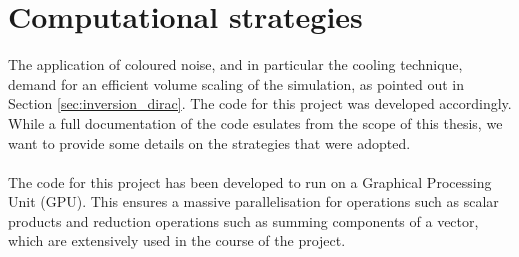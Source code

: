 \chapter{Computational strategies}
\label{chap:AppendixC}
The application of coloured noise, and in particular the cooling technique, demand for an efficient volume scaling of the simulation, as pointed out in Section \ref{sec:inversion_dirac}. The code for this project was developed accordingly. \\
While a full documentation of the code esulates from the scope of this thesis, we want to provide some details on the strategies that were adopted. \\~\\
The code for this project has been developed to run on a Graphical Processing Unit (GPU). This ensures a massive parallelisation for operations such as scalar products and reduction operations such as summing components of a vector, which are extensively used in the course of the project.
